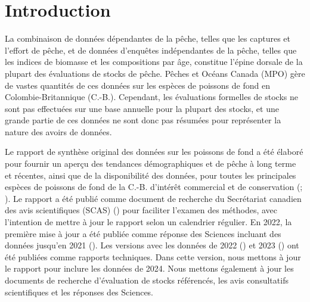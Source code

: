 \documentclass[12pt]{article}\usepackage[]{graphicx}\usepackage[]{color}
\begin{document}
\renewcommand{\tablename}{Tableau}


\frontmatter


\renewcommand{\headrulewidth}{0.5pt}  %
\renewcommand{\footrulewidth}{0.5pt}  %

\newcommand{\lt}{\ensuremath <}
\newcommand{\gt}{\ensuremath >}

% 
\section{Introduction}\label{sec:introduction}

La combinaison de données dépendantes de la pêche, telles que les captures et l'effort de pêche, et de données d'enquêtes indépendantes de la pêche, telles que les indices de biomasse et les compositions par âge, constitue l'épine dorsale de la plupart des évaluations de stocks de pêche. Pêches et Océans Canada (MPO) gère de vastes quantités de ces données sur les espèces de poissons de fond en Colombie-Britannique (C.-B.). Cependant, les évaluations formelles de stocks ne sont pas effectuées sur une base annuelle pour la plupart des stocks, et une grande partie de ces données ne sont donc pas résumées pour représenter la nature des avoirs de données.

Le rapport de synthèse original des données sur les poissons de fond a été élaboré pour fournir un aperçu des tendances démographiques et de pêche à long terme et récentes, ainsi que de la disponibilité des données, pour toutes les principales espèces de poissons de fond de la C.-B. d'intérêt commercial et de conservation (; ). Le rapport a été publié comme document de recherche du Secrétariat canadien des avis scientifiques (SCAS) () pour faciliter l'examen des méthodes, avec l'intention de mettre à jour le rapport selon un calendrier régulier. En 2022, la première mise à jour a été publiée comme réponse des Sciences incluant des données jusqu'en 2021 (). Les versions avec les données de 2022 () et 2023 () ont été publiées comme rapports techniques. Dans cette version, nous mettons à jour le rapport pour inclure les données de 2024. Nous mettons également à jour les documents de recherche d'évaluation de stocks référencés, les avis consultatifs scientifiques et les réponses des Sciences.
\end{document}

